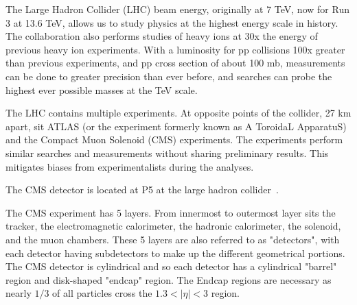 The Large Hadron Collider (LHC) beam energy, originally at 7 TeV, now for Run 3 at 13.6 TeV, allows us to study physics at the highest energy scale in history. The collaboration also performs studies of heavy ions at 30x the energy of previous heavy ion experiments. With a luminosity for pp collisions 100x greater than previous experiments, and pp cross section of about 100 mb, measurements can be done to greater precision than ever before, and searches can probe the highest ever possible masses at the TeV scale.

The LHC contains multiple experiments. At opposite points of the collider, 27 km apart, sit ATLAS (or the experiment formerly known as A ToroidaL ApparatuS) and the Compact Muon Solenoid (CMS) experiments. The experiments perform similar searches and measurements without sharing preliminary results. This mitigates biases from experimentalists during the analyses.

The CMS detector is located at P5 at the large hadron collider~\cite{CMSExperiment}.


The CMS experiment has 5 layers. From innermost to outermost layer sits the tracker, the electromagnetic calorimeter, the hadronic calorimeter, the solenoid, and the muon chambers. These 5 layers are also referred to as "detectors", with each detector having subdetectors to make up the different geometrical portions. The CMS detector is cylindrical and so each detector has a cylindrical "barrel" region and disk-shaped "endcap" region. The Endcap regions are necessary as nearly $1/3$ of all particles cross the $1.3 < |\eta| < 3$ region.